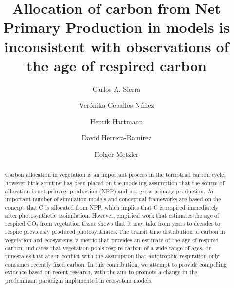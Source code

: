 \documentclass[12pt, a4paper]{article}
\title{\bf Allocation of carbon from Net Primary Production in models is inconsistent with observations of the age of respired carbon}
\author[1,2]{Carlos A. Sierra}
\author[3]{Ver\'onika Ceballos-N\'u\~nez}
\author[1]{Henrik Hartmann}
\author[1]{David Herrera-Ramírez}
\author[2]{Holger Metzler}
\affil[1]{Max Planck Institute for Biogeochemistry, 07745 Jena, Germany}
\affil[2]{Swedish University of Agricultural Sciences, 75651 Uppsala, Sweden}
\affil[3]{Leipzig University, 04103 Leipzig, Germany}
\date{} %
\begin{document}
\maketitle
\linenumbers

\begin{abstract} \noindent
Carbon allocation in vegetation is an important process in the terrestrial carbon cycle, however little scrutiny has been placed on the modeling assumption that the source of allocation is net primary production (NPP) and not gross primary production. An important number of simulation models and conceptual frameworks are based on the concept that C is allocated from NPP, which implies that C is respired immediately after photosynthetic assimilation. However, empirical work that estimates the age of respired CO$_2$ from vegetation tissue shows that it may take from years to decades to respire previously produced photosynthates. The transit time distribution of carbon in vegetation and ecosystems, a metric that provides an estimate of the age of respired carbon, indicates that vegetation pools respire carbon of a wide range of ages, on timescales that are in conflict with the assumption that autotrophic respiration only consumes recently fixed carbon. In this contribution, we attempt to provide compelling evidence based on recent research, with the aim to promote a change in the predominant paradigm implemented in ecosystem models.
\end{abstract}
\end{document}
